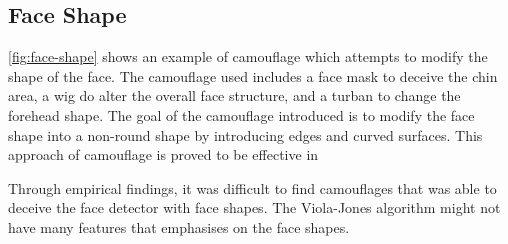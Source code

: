 \documentclass[10pt,twocolumn,letterpaper]{article}
\begin{document}
\subsection{Face Shape} \label{sec:face-shape}

\cref{fig:face-shape} shows an example of camouflage which attempts to modify the shape of the face. The camouflage used includes a face mask to deceive the chin area, a wig do alter the overall face structure, and a turban to change the forehead shape. The goal of the camouflage introduced is to modify the face shape into a non-round shape by introducing edges and curved surfaces. This approach of camouflage is proved to be effective in \cite{facilitating-fashion-camouflage-art}

Through empirical findings, it was difficult to find camouflages that was able to deceive the face detector with face shapes. The Viola-Jones algorithm might not have many features that emphasises on the face shapes.
\end{document}
